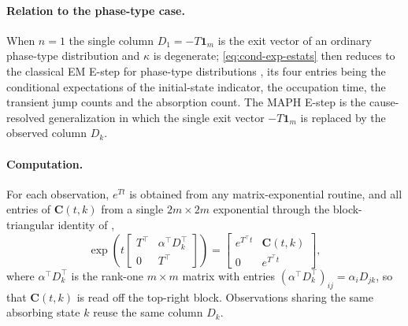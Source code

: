 \documentclass{article}
\newcommand{\subchg}[1]{#1}
\begin{document}
\paragraph{Relation to the phase-type case.} When $n=1$ the single column $D_1=-T\mathbf 1_m$ is the exit vector of an ordinary phase-type distribution and $\kappa$ is degenerate; \eqref{eq:cond-exp-estats} then reduces to the classical EM E-step for phase-type distributions \citep{Asmussen1996FittingPD}, \subchg{its four entries being the conditional expectations of the initial-state indicator, the occupation time, the transient jump counts and the absorption count}. The MAPH E-step is the cause-resolved generalization in which the single exit vector $-T\mathbf 1_m$ is replaced by the observed column $D_k$.

\paragraph{Computation.} For each observation, $e^{Tt}$ is obtained from any matrix-exponential routine, and all entries of $\mathbf C(t,k)$ from a single $2m\times2m$ exponential through the block-triangular identity of \citet{vanloan_1978},
\begin{equation}
\label{eq:vanloan-block}
\exp\!\left( t\begin{bmatrix} T^\intercal & \alpha^\intercal D_k^\intercal \\[2pt] 0 & T^\intercal \end{bmatrix}\right)
=\begin{bmatrix} e^{T^\intercal t} & \mathbf C(t,k) \\[2pt] 0 & e^{T^\intercal t}\end{bmatrix},
\end{equation}
where $\alpha^\intercal D_k^\intercal$ is the rank-one $m\times m$ matrix with entries $(\alpha^\intercal D_k^\intercal)_{ij}=\alpha_i D_{jk}$, so that $\mathbf C(t,k)$ is read off the top-right block. Observations sharing the same absorbing state $k$ reuse the same column $D_k$.
\end{document}
